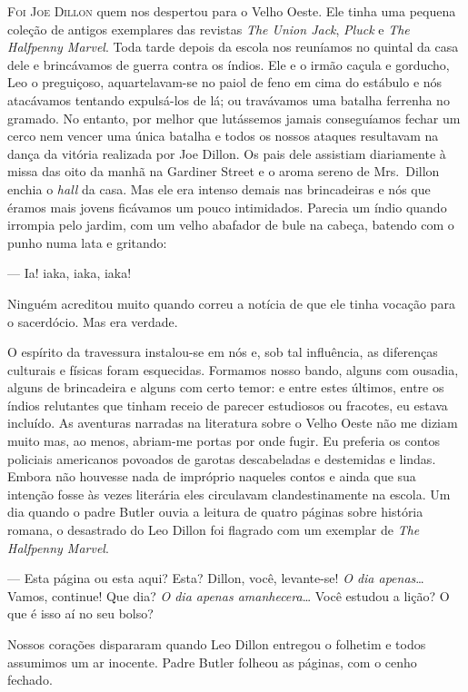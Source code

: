 \textsc{Foi Joe Dillon} quem nos despertou para o Velho Oeste.  Ele tinha uma
pequena coleção de antigos exemplares das revistas \textit{The Union
Jack}, \textit{Pluck} e \textit{The Halfpenny Marvel}.  Toda tarde
depois da escola nos reuníamos no quintal da casa dele e brincávamos de guerra
contra os índios.  Ele e o irmão caçula e gorducho, Leo o preguiçoso,
aquartelavam-se no paiol de feno em cima do estábulo e nós atacávamos tentando
expulsá-los de lá; ou travávamos uma batalha ferrenha no gramado.  No entanto,
por melhor que lutássemos jamais conseguíamos fechar um cerco nem vencer uma
única batalha e todos os nossos ataques resultavam na dança da vitória
realizada por Joe Dillon.  Os pais dele assistiam diariamente à missa das oito
da manhã na Gardiner Street e o aroma sereno de Mrs.~Dillon enchia o
\textit{hall} da casa.  Mas ele era intenso demais nas brincadeiras e nós que
éramos mais jovens ficávamos um pouco intimidados.  Parecia um índio quando
irrompia pelo jardim, com um velho abafador de bule na cabeça, batendo com o
punho numa lata e gritando:

--- Ia! iaka, iaka, iaka!

Ninguém acreditou muito quando correu a notícia de que ele tinha vocação para o
sacerdócio.  Mas era verdade.

O espírito da travessura instalou-se em nós e, sob tal influência, as
diferenças culturais e físicas foram esquecidas.  Formamos nosso bando, alguns
com ousadia, alguns de brincadeira e alguns com certo temor: e entre estes
últimos, entre os índios relutantes que tinham receio de parecer estudiosos ou
fracotes, eu estava incluído.  As aventuras narradas na literatura sobre o
Velho Oeste não me diziam muito mas, ao menos, abriam-me portas por onde fugir.
Eu preferia os contos policiais americanos povoados de garotas descabeladas e
destemidas e lindas.  Embora não houvesse nada de impróprio naqueles contos e
ainda que sua intenção fosse às vezes literária eles circulavam
clandestinamente na escola.  Um dia quando o padre Butler ouvia a leitura de
quatro páginas sobre história romana, o desastrado do Leo Dillon foi flagrado
com um exemplar de \textit{The Halfpenny Marvel}.

--- Esta página ou esta aqui?  Esta?  Dillon, você, levante-se!  \textit{O dia
apenas}\ldots{} Vamos, continue!  Que dia?  \textit{O dia apenas
amanhecera}\ldots{}  Você estudou a lição?  O que é isso aí no seu bolso?

Nossos corações dispararam quando Leo Dillon entregou o folhetim e todos
assumimos um ar inocente.  Padre Butler folheou as páginas, com o cenho
fechado.

